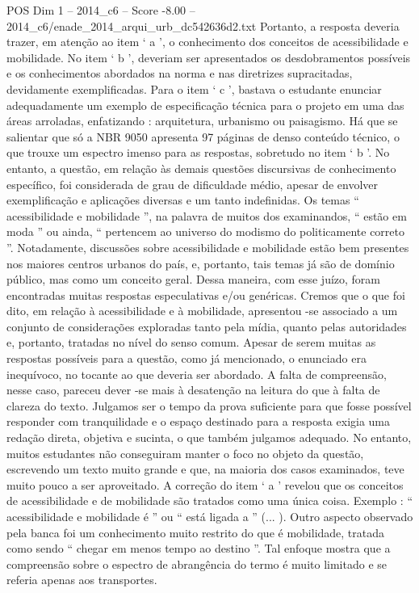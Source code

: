 \begin{textsample}{POS Dim 1 – 2014\_c6 – Score -8.00 – 2014\_c6/enade\_2014\_arqui\_urb\_dc542636d2.txt}
Portanto, a resposta deveria trazer, em atenção ao item ‘ a ’, o conhecimento dos conceitos de acessibilidade e mobilidade.
No item ‘ b ’, deveriam ser apresentados os desdobramentos possíveis e os conhecimentos abordados na norma e nas diretrizes supracitadas, devidamente exemplificadas.
Para o item ‘ c ’, bastava o estudante enunciar adequadamente um exemplo de especificação técnica para o projeto em uma das áreas arroladas, enfatizando : arquitetura, urbanismo ou paisagismo.
Há que se salientar que só a NBR 9050 apresenta 97 páginas de denso conteúdo técnico, o que trouxe um espectro imenso para as respostas, sobretudo no item ‘ b ’.
No entanto, a questão, em relação às demais questões discursivas de conhecimento específico, foi considerada de grau de dificuldade médio, apesar de envolver exemplificação e aplicações diversas e um tanto indefinidas.
Os temas “ acessibilidade e mobilidade ”, na palavra de muitos dos examinandos, “ estão em moda ” ou ainda, “ pertencem ao universo do modismo do politicamente correto ”.
Notadamente, discussões sobre acessibilidade e mobilidade estão bem presentes nos maiores centros urbanos do país, e, portanto, tais temas já são de domínio público, mas como um conceito geral.
Dessa maneira, com esse juízo, foram encontradas muitas respostas especulativas e/ou genéricas.
Cremos que o que foi dito, em relação à acessibilidade e à mobilidade, apresentou -se associado a um conjunto de considerações exploradas tanto pela mídia, quanto pelas autoridades e, portanto, tratadas no nível do senso comum.
Apesar de serem muitas as respostas possíveis para a questão, como já mencionado, o enunciado era inequívoco, no tocante ao que deveria ser abordado.
A falta de compreensão, nesse caso, pareceu dever -se mais à desatenção na leitura do que à falta de clareza do texto.
Julgamos ser o tempo da prova suficiente para que fosse possível responder com tranquilidade e o espaço destinado para a resposta exigia uma redação direta, objetiva e sucinta, o que também julgamos adequado.
No entanto, muitos estudantes não conseguiram manter o foco no objeto da questão, escrevendo um texto muito grande e que, na maioria dos casos examinados, teve muito pouco a ser aproveitado.
A correção do item ‘ a ’ revelou que os conceitos de acessibilidade e de mobilidade são tratados como uma única coisa.
Exemplo : “ acessibilidade e mobilidade é ” ou “ está ligada a ” (... ).
Outro aspecto observado pela banca foi um conhecimento muito restrito do que é mobilidade, tratada como sendo “ chegar em menos tempo ao destino ”.
Tal enfoque mostra que a compreensão sobre o espectro de abrangência do termo é muito limitado e se referia apenas aos transportes.

\end{textsample}
